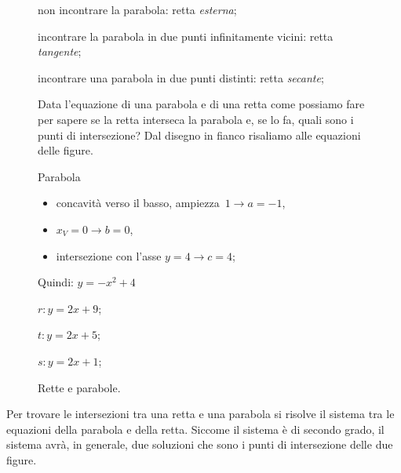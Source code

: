 \begin{figure}[h]
\begin{minipage}{.55\textwidth}
\begin{enumerate*}
 \item non incontrare la parabola: retta \emph{esterna};
 \item incontrare la parabola in due punti infinitamente vicini: retta
  \emph{tangente};
 \item incontrare una parabola in due punti distinti: retta \emph{secante};
\end{enumerate*}
Data l'equazione di una parabola e di una retta come possiamo fare per sapere
se la retta interseca la parabola e, se lo fa, quali sono i punti di
intersezione?
Dal disegno in fianco risaliamo alle equazioni delle figure.

\begin{enumeratea}
 \item Parabola
  \begin{itemize}
   \item concavità verso il basso, ampiezza~\(1 \rightarrow a=-1\),
   \item \(x_V=0 \rightarrow b=0\),
   \item intersezione con l'asse \(y=4 \rightarrow c=4\);
  \end{itemize}
  Quindi: \(y=-x^2+4\)
 \item \(r: y=2x+9\);
 \item \(t: y=2x+5\);
 \item \(s: y=2x+1\);
\end{enumeratea}
\end{minipage}
\begin{minipage}{.40\textwidth}
\begin{inaccessibleblock}[Parabola di equazione \(y=x^2\).]
\centering
\scalebox{.9}{  \parabolaerette}
  \caption{Rette e parabole.} \label{fig:parabola_parabolaerette}
\end{inaccessibleblock}
\end{minipage}
\end{figure}

Per trovare le intersezioni tra una retta e una parabola si risolve il
sistema tra le equazioni della parabola e della retta. Siccome il sistema è
di secondo grado, il sistema avrà, in generale, due soluzioni che sono i
punti di intersezione delle due figure.

